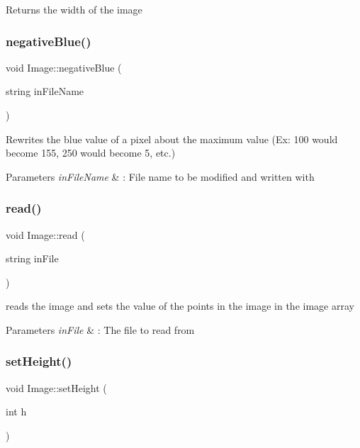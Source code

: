 Returns the width of the image \mbox{\label{classImage_a1a5d7d2e612755c22f29a13f4f940da8}} 
\subsubsection{\texorpdfstring{negative\+Blue()}{negativeBlue()}}
{\footnotesize\ttfamily void Image\+::negative\+Blue (\begin{DoxyParamCaption}\item[{string}]{in\+File\+Name }\end{DoxyParamCaption})}

Rewrites the blue value of a pixel about the maximum value (Ex\+: 100 would become 155, 250 would become 5, etc.) 
\begin{DoxyParams}{Parameters}
{\em in\+File\+Name} & \+: File name to be modified and written with \\
\hline
\end{DoxyParams}
\mbox{\label{classImage_a4d32b8fc59d99587542ea6834921958c}} 
\subsubsection{\texorpdfstring{read()}{read()}}
{\footnotesize\ttfamily void Image\+::read (\begin{DoxyParamCaption}\item[{string}]{in\+File }\end{DoxyParamCaption})}

reads the image and sets the value of the points in the image in the image array 
\begin{DoxyParams}{Parameters}
{\em in\+File} & \+: The file to read from \\
\hline
\end{DoxyParams}
\mbox{\label{classImage_a6e15783dcc55c301f4e887e27a7c38be}} 
\subsubsection{\texorpdfstring{set\+Height()}{setHeight()}}
{\footnotesize\ttfamily void Image\+::set\+Height (\begin{DoxyParamCaption}\item[{int}]{h }\end{DoxyParamCaption})}


